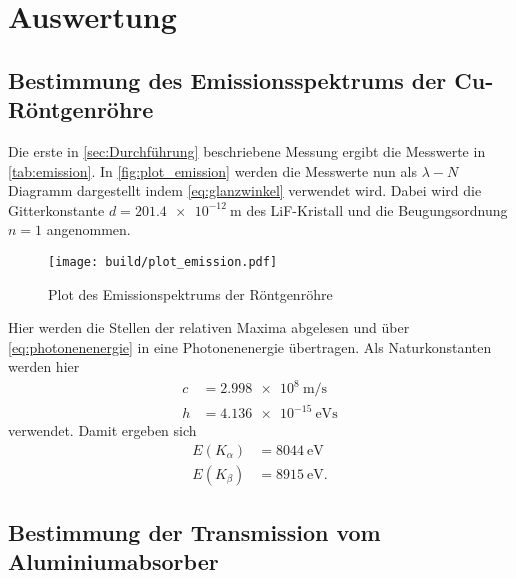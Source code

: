 \section{Auswertung}
\label{sec:Auswertung}



\subsection{Bestimmung des Emissionsspektrums der Cu-Röntgenröhre}
\label{ss:Emission}

Die erste in \autoref{sec:Durchführung} beschriebene Messung ergibt die Messwerte in \autoref{tab:emission}.
In \autoref{fig:plot_emission} werden die Messwerte nun als $\lambda-N$ Diagramm dargestellt indem \autoref{eq:glanzwinkel} verwendet wird.
Dabei wird die Gitterkonstante $d=\SI{201.4e-12}{\metre}$ des LiF-Kristall und die Beugungsordnung $n=1$ angenommen.

\begin{figure}
    \centering
    \texttt{[image: build/plot\_emission.pdf]}
    \caption{Plot des Emissionspektrums der Röntgenröhre}
    \label{fig:plot_emission}
\end{figure}

Hier werden die Stellen der relativen Maxima abgelesen und über \autoref{eq:photonenenergie} in eine Photonenenergie übertragen.
Als Naturkonstanten werden hier
\begin{align*}
    c &= \SI{2.998e8}{\metre\per\second} \\
    h &= \SI{4.136e-15}{\electronvolt\second}
\end{align*}
verwendet. \cite{physics_constants}
Damit ergeben sich 
\begin{align*}
    E(K_\alpha) &= \SI{8044}{\electronvolt} \\
    E(K_\beta) &= \SI{8915}{\electronvolt} .
\end{align*}

\subsection{Bestimmung der Transmission vom Aluminiumabsorber}
\label{ssec:transmission}

